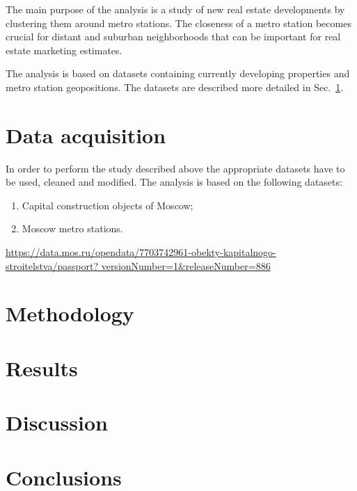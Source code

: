 \documentclass{cernatlasnote}
\begin{document}
The main purpose of the analysis is  a study of new real estate developments by clustering them around
metro stations.
The closeness of a metro station becomes crucial for distant and suburban neighborhoods that can be important
for real estate marketing estimates.

The analysis is based on datasets containing currently developing properties and metro station geopositions.
The datasets are described more detailed in Sec.~\ref{data}. 

\section{Data acquisition}
\label{data}

In order to perform the study described above the appropriate datasets have to be used, cleaned and modified.
The analysis is based on the following datasets:
\begin{enumerate}
\item Capital construction objects of Moscow;
\item Moscow metro stations.
\end{enumerate}


\small{\url{https://data.mos.ru/opendata/7703742961-obekty-kapitalnogo-stroitelstva/passport?
versionNumber=1&releaseNumber=886}}
\section{Methodology}
\label{method}

\section{Results}
\label{results}

\section{Discussion}
\label{disc}


\section{Conclusions}
\label{concl}
\end{document}
